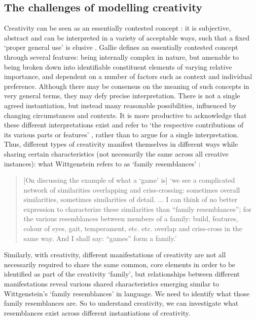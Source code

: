 \documentclass[10pt,letterpaper]{article}
\begin{document}
\subsection*{The challenges of modelling creativity} \label{cogPhil}


Creativity can be seen as an essentially contested concept \cite{gallie56}: it is subjective, abstract and can be interpreted in a variety of acceptable ways, such that a fixed `proper general use' is elusive \cite[p. 167]{gallie56}. Gallie defines an essentially contested concept through several features: being internally complex in nature, but amenable to being broken down into identifiable constituent elements of varying relative importance, and dependent on a number of factors such as context and individual preference. Although there may be consensus on the meaning of such concepts in very general terms, they may defy precise interpretation. There is not a single agreed instantiation, but instead many reasonable possibilities, influenced by changing circumstances and contexts. It is more productive to acknowledge that these different interpretations exist and refer to `the respective contributions of its various parts or features' \cite[p. 172]{gallie56}, rather than to argue for a single interpretation. Thus, different types of creativity manifest themselves in different ways while sharing certain characteristics (not necessarily the same across all creative instances): what Wittgenstein refers to as `family resemblances' \cite{wittgenstein58}:

\begin{quote}
[On discussing the example of what a `game' is] `we see a complicated network of similarities overlapping and criss-crossing: sometimes overall similarities, sometimes similarities of detail. ... I can think of no better expression to characterize these similarities than ``family resemblances''; for the various resemblances between members of a family: build, features, colour of eyes, gait, temperament, etc. etc. overlap and criss-cross in the same way. And I shall say: ``games'' form a family.'
\cite[Part 1, Paragraphs 66-67]{wittgenstein58}
\end{quote}

Similarly, with creativity, different manifestations of creativity are not all necessarily required to share the same common, core elements in order to be identified as part of the creativity `family', but relationships between different manifestations reveal various shared characteristics emerging similar to Wittgenstein's `family resemblances' in language. We need to identify what those family resemblances are. So to understand creativity, we can investigate what resemblances exist across different instantiations of creativity. 
\end{document}
